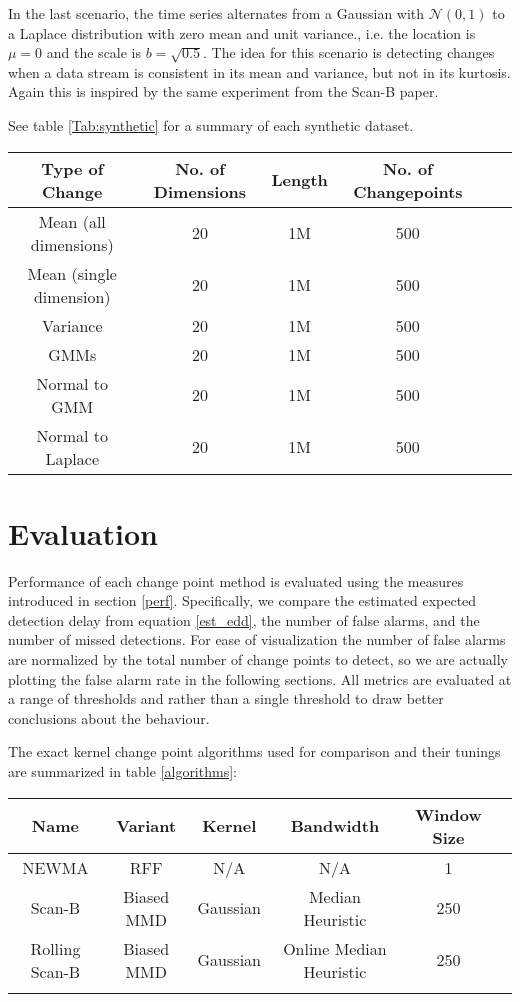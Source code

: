 In the last scenario, the time series alternates from a Gaussian with $\mathcal{N}(0,1)$ to a Laplace distribution with zero mean and unit variance., i.e. the location is $\mu=0$ and the scale is $b=\sqrt{0.5}$. The idea for this scenario is detecting changes when a data stream is consistent in its mean and variance, but not in its kurtosis. Again this is inspired by the same experiment from the Scan-B paper.

See table \ref{Tab:synthetic} for a summary of each synthetic dataset.

\begin{center}
\begin{tabular}{SSSSSS} \toprule
    {Type of Change} & {No. of Dimensions} & {Length} & {No. of Changepoints}  \\ \midrule
    {Mean (all dimensions)}  & 20 & {1M} & 500  \\
    {Mean (single dimension)}  & 20 & {1M} & 500  \\
    {Variance}  & 20 & {1M} & 500  \\
    {GMMs}  & 20 & {1M}  & 500  \\ 
    {Normal to GMM}  & 20 & {1M}  & 500  \\ 
    {Normal to Laplace} & 20 & {1M}  & 500  \\ \bottomrule
\end{tabular}
 \label{Tab:synthetic}
\end{center}

\section{Evaluation}
\label{eval}
Performance of each change point method is evaluated using the measures introduced in section \ref{perf}. Specifically, we compare the estimated expected detection delay from equation \ref{est_edd}, the number of false alarms, and the number of missed detections. For ease of visualization the number of false alarms are normalized by the total number of change points to detect, so we are actually plotting the false alarm rate in the following sections. All metrics are evaluated at a range of thresholds and rather than a single threshold to draw better conclusions about the behaviour.

The exact kernel change point algorithms used for comparison and their tunings are summarized in table \ref{algorithms}:

\begin{center}
\begin{tabular}{SSSSSS} \toprule
    {Name} & {Variant} & {Kernel} & {Bandwidth} & {Window Size}\\ \midrule
    {NEWMA}  & {RFF} & {N/A} & {N/A} & 1  \\
    {Scan-B}  & {Biased MMD}  & {Gaussian} & {Median Heuristic} & 250   \\
    {Rolling Scan-B} & {Biased MMD}   & {Gaussian} & {Online Median Heuristic}  & 250  \\ \bottomrule
\label{algorithms}
\end{tabular}
\end{center}

